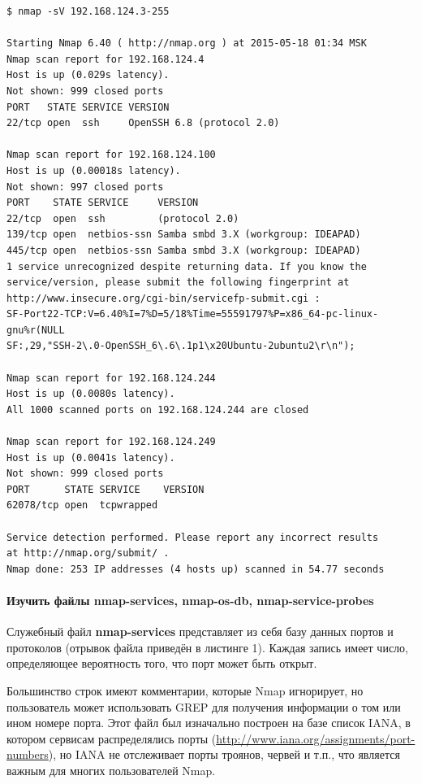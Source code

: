 \begin{Verbatim}[frame=single]
$ nmap -sV 192.168.124.3-255

Starting Nmap 6.40 ( http://nmap.org ) at 2015-05-18 01:34 MSK
Nmap scan report for 192.168.124.4
Host is up (0.029s latency).
Not shown: 999 closed ports
PORT   STATE SERVICE VERSION
22/tcp open  ssh     OpenSSH 6.8 (protocol 2.0)

Nmap scan report for 192.168.124.100
Host is up (0.00018s latency).
Not shown: 997 closed ports
PORT    STATE SERVICE     VERSION
22/tcp  open  ssh         (protocol 2.0)
139/tcp open  netbios-ssn Samba smbd 3.X (workgroup: IDEAPAD)
445/tcp open  netbios-ssn Samba smbd 3.X (workgroup: IDEAPAD)
1 service unrecognized despite returning data. If you know the
service/version, please submit the following fingerprint at
http://www.insecure.org/cgi-bin/servicefp-submit.cgi :
SF-Port22-TCP:V=6.40%I=7%D=5/18%Time=55591797%P=x86_64-pc-linux-gnu%r(NULL
SF:,29,"SSH-2\.0-OpenSSH_6\.6\.1p1\x20Ubuntu-2ubuntu2\r\n");

Nmap scan report for 192.168.124.244
Host is up (0.0080s latency).
All 1000 scanned ports on 192.168.124.244 are closed

Nmap scan report for 192.168.124.249
Host is up (0.0041s latency).
Not shown: 999 closed ports
PORT      STATE SERVICE    VERSION
62078/tcp open  tcpwrapped

Service detection performed. Please report any incorrect results
at http://nmap.org/submit/ .
Nmap done: 253 IP addresses (4 hosts up) scanned in 54.77 seconds
\end{Verbatim}

\paragraph{Изучить файлы nmap-services, nmap-os-db, nmap-service-probes}

Служебный файл \textbf{nmap-services} представляет из себя базу данных портов и протоколов (отрывок файла приведён в листинге 1). Каждая запись имеет число, определяющее вероятность того, что порт может быть открыт.

Большинство строк имеют комментарии, которые Nmap игнорирует, но пользователь может использовать GREP для получения информации о том или ином номере порта. Этот файл был изначально построен на базе список IANA, в котором сервисам распределялись порты (\url{http://www.iana.org/assignments/port-numbers}), но IANA не отслеживает порты троянов, червей и т.п., что является важным для многих пользователей Nmap.

